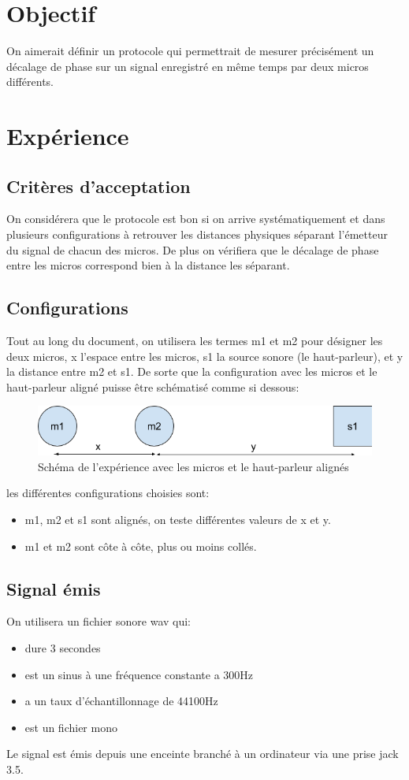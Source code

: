\section{Objectif}
On aimerait définir un protocole qui permettrait de mesurer précisément un décalage de phase sur un signal enregistré en même temps par deux micros différents.


\section{Expérience}
\subsection{Critères d'acceptation}
On considérera que le protocole est bon si on arrive systématiquement et dans plusieurs configurations à retrouver les distances physiques séparant l'émetteur du signal de chacun des micros. De plus on vérifiera que le décalage de phase entre les micros correspond bien à la distance les séparant.

\subsection{Configurations}
Tout au long du document, on utilisera les termes m1 et m2 pour désigner les deux micros, x l'espace entre les micros, s1 la source sonore (le haut-parleur), et y la distance entre m2 et s1. De sorte que la configuration avec les micros et le haut-parleur aligné puisse être schématisé comme si dessous:
\begin{figure}[H]
\includegraphics[width=\textwidth]{../tests/test_du_protocole/schema.png} 
\caption{Schéma de l'expérience avec les micros et le haut-parleur alignés}
\end{figure}
les différentes configurations choisies sont:
\begin{itemize}
\item m1, m2 et s1 sont alignés, on teste différentes valeurs de x et y.
\item m1 et m2 sont côte à côte, plus ou moins collés.
\end{itemize}
\subsection{Signal émis}
On utilisera un fichier sonore wav qui:
\begin{itemize}
\item dure 3 secondes
\item est un sinus à une fréquence constante a 300Hz
\item a un taux d'échantillonnage de 44100Hz
\item est un fichier mono
\end{itemize}
Le signal est émis depuis une enceinte branché à un ordinateur via une prise jack 3.5.



